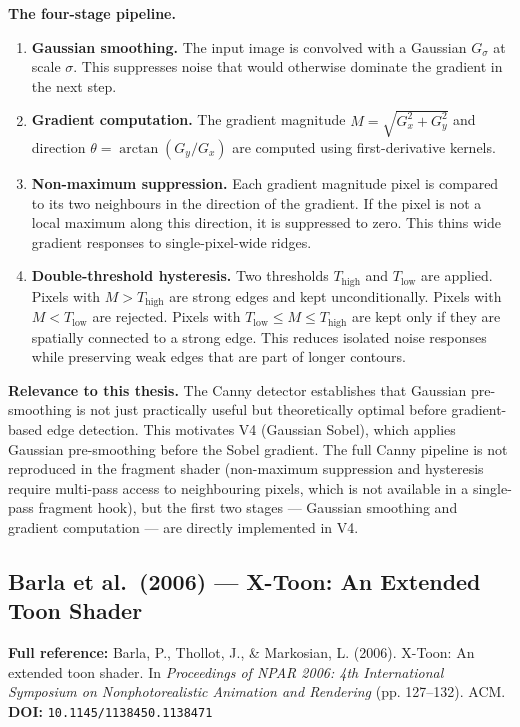 \documentclass[11pt, a4paper]{article}
\begin{document}
\textbf{The four-stage pipeline.}
\begin{enumerate}[leftmargin=2.5em]
  \item \textbf{Gaussian smoothing.} The input image is convolved with a Gaussian $G_\sigma$ at scale $\sigma$. This suppresses noise that would otherwise dominate the gradient in the next step.
  \item \textbf{Gradient computation.} The gradient magnitude $M = \sqrt{G_x^2 + G_y^2}$ and direction $\theta = \arctan(G_y/G_x)$ are computed using first-derivative kernels.
  \item \textbf{Non-maximum suppression.} Each gradient magnitude pixel is compared to its two neighbours in the direction of the gradient. If the pixel is not a local maximum along this direction, it is suppressed to zero. This thins wide gradient responses to single-pixel-wide ridges.
  \item \textbf{Double-threshold hysteresis.} Two thresholds $T_{\text{high}}$ and $T_{\text{low}}$ are applied. Pixels with $M > T_{\text{high}}$ are strong edges and kept unconditionally. Pixels with $M < T_{\text{low}}$ are rejected. Pixels with $T_{\text{low}} \leq M \leq T_{\text{high}}$ are kept only if they are spatially connected to a strong edge. This reduces isolated noise responses while preserving weak edges that are part of longer contours.
\end{enumerate}

\textbf{Relevance to this thesis.} The Canny detector establishes that Gaussian pre-smoothing is not just practically useful but theoretically optimal before gradient-based edge detection. This motivates V4 (Gaussian Sobel), which applies Gaussian pre-smoothing before the Sobel gradient. The full Canny pipeline is not reproduced in the fragment shader (non-maximum suppression and hysteresis require multi-pass access to neighbouring pixels, which is not available in a single-pass fragment hook), but the first two stages --- Gaussian smoothing and gradient computation --- are directly implemented in V4.

\vspace{8pt}
\subsection{Barla et al.\ (2006) --- X-Toon: An Extended Toon Shader}

\begin{refbox}
\textbf{Full reference:} Barla, P., Thollot, J., \& Markosian, L. (2006). X-Toon: An extended toon shader. In \textit{Proceedings of NPAR 2006: 4th International Symposium on Nonphotorealistic Animation and Rendering} (pp. 127--132). ACM.\\[4pt]
\textbf{DOI:} \texttt{10.1145/1138450.1138471}
\end{refbox}
\end{document}
